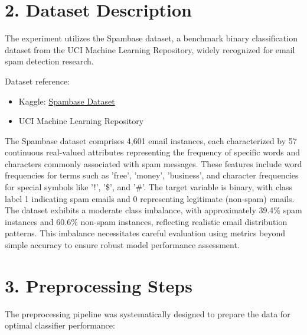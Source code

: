 \documentclass[11pt]{article}
\begin{document}
\section*{2. Dataset Description}
The experiment utilizes the Spambase dataset, a benchmark binary classification dataset from the UCI Machine Learning Repository, widely recognized for email spam detection research.

Dataset reference:
\begin{itemize}
    \item Kaggle: \href{https://www.kaggle.com/datasets/somesh24/spambase}{Spambase Dataset}
    \item UCI Machine Learning Repository
\end{itemize}

The Spambase dataset comprises 4,601 email instances, each characterized by 57 continuous real-valued attributes representing the frequency of specific words and characters commonly associated with spam messages. These features include word frequencies for terms such as 'free', 'money', 'business', and character frequencies for special symbols like '!', '\$', and '\#'. The target variable is binary, with class label 1 indicating spam emails and 0 representing legitimate (non-spam) emails. The dataset exhibits a moderate class imbalance, with approximately 39.4\% spam instances and 60.6\% non-spam instances, reflecting realistic email distribution patterns. This imbalance necessitates careful evaluation using metrics beyond simple accuracy to ensure robust model performance assessment.

\section*{3. Preprocessing Steps}
The preprocessing pipeline was systematically designed to prepare the data for optimal classifier performance:
\end{document}
